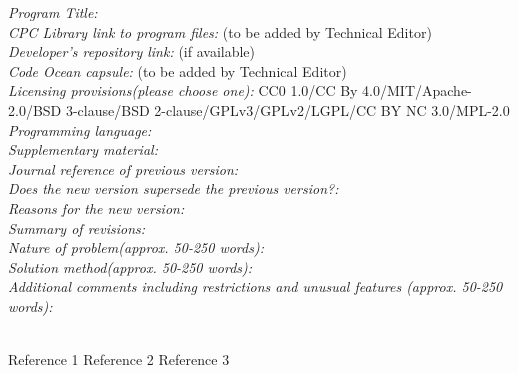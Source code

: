 \documentclass[preprint,12pt]{elsarticle}
\begin{document}
\begin{small}
  \noindent
  {\em Program Title:}                                          \\
  {\em CPC Library link to program files:} (to be added by Technical Editor) \\
  {\em Developer's repository link:} (if available) \\
  {\em Code Ocean capsule:} (to be added by Technical Editor)\\
  {\em Licensing provisions(please choose one):} CC0 1.0/CC By 4.0/MIT/Apache-2.0/BSD 3-clause/BSD 2-clause/GPLv3/GPLv2/LGPL/CC BY NC 3.0/MPL-2.0  \\
  {\em Programming language:}                                   \\
  {\em Supplementary material:}                                 \\
  {\em Journal reference of previous version:}                  \\
  {\em Does the new version supersede the previous version?:}   \\
  {\em Reasons for the new version:}\\
  {\em Summary of revisions:}\\
  {\em Nature of problem(approx. 50-250 words):}\\
  {\em Solution method(approx. 50-250 words):}\\
  {\em Additional comments including restrictions and unusual features (approx. 50-250 words):}\\
  \\

  \begin{thebibliography}{0}
    Reference 1         %
    Reference 2         %
    Reference 3         %
  \end{thebibliography}

\end{small}


\section{}
\label{}

\end{document}
